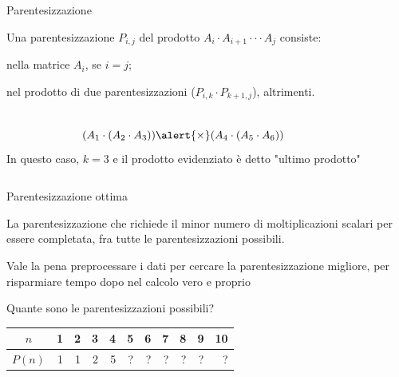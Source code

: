 \begin{frame}{Parentesizzazione}

\vspace{-9pt}
\begin{myboxtitle}[Parentesizzazione]
Una \alert{parentesizzazione} $P_{i,j}$ del prodotto $A_i \cdot A_{i+1} \cdot \cdot \cdot A_j$ consiste:
\BI
\item nella matrice $A_i$, se $i = j$; 
\item nel prodotto di due parentesizzazioni ($P_{i,k} \cdot P_{k+1,j}$), altrimenti.
\EI
\end{myboxtitle}

\begin{columns}[T]
\[
(A_1 \cdot (A_2 \cdot A_3 ))  \alert{\times}  (A_4 \cdot (A_5 \cdot A_6 )) 
\]
In questo caso, $k=3$ e il prodotto evidenziato 
è detto "\alert{ultimo prodotto}"
\vspace{-6pt}
\end{columns}

\end{frame}

\begin{frame}{Parentesizzazione ottima}

\vspace{-9pt}
\begin{myboxtitle}
La parentesizzazione che richiede il minor numero di moltiplicazioni scalari per essere completata, fra tutte le parentesizzazioni possibili.
\end{myboxtitle}

\begin{myboxtitle}[Motivazione]
Vale la pena preprocessare i dati per cercare la parentesizzazione migliore, per risparmiare tempo dopo nel calcolo vero e proprio
\end{myboxtitle}

\begin{myboxtitle}[Domanda]
Quante sono le parentesizzazioni possibili?
\begin{center}
\begin{tabular}{|c|r|r|r|r|r|r|r|r|r|r|}
\hline
$n$ & \phantom{0}1 & \phantom{0}2 & \phantom{0}3 & \phantom{0}4 & \phantom{0}5 & \phantom{0}6 & \phantom{0}7 & \phantom{0}8 & \phantom{0}9 & \phantom{0}10 \\\hline
$P(n)$ & 1 & 1 & 2 & 5 & ? & ? & ? & ? & ? & ? \\\hline
\end{tabular}
\end{center}
\end{myboxtitle}
\end{frame}

